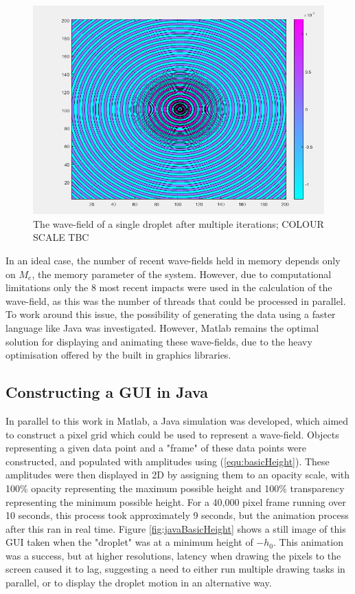 \begin{figure}
\centering
\includegraphics[width=\textwidth]{simulation/matlab.png}
\caption{The wave-field of a single droplet after multiple iterations; COLOUR SCALE TBC}
\label{fig:matlabMaths}
\end{figure}

In an ideal case, the number of recent wave-fields held in memory depends only on $M_e$, the memory parameter of the system. However, due to computational limitations only the 8 most recent impacts were used in the calculation of the wave-field, as this was the number of threads that could be processed in parallel. To work around this issue, the possibility of generating the data using a faster language like Java was investigated. However, Matlab remains the optimal solution for displaying and animating these wave-fields, due to the heavy optimisation offered by the built in graphics libraries.


\subsection{Constructing a GUI in Java}
In parallel to this work in Matlab, a Java simulation was developed, which aimed to construct a pixel grid which could be used to represent a wave-field. Objects representing a given data point and a "frame" of these data points were constructed, and populated with amplitudes using (\ref{equ:basicHeight}). These amplitudes were then displayed in 2D by assigning them to an opacity scale, with 100\% opacity representing the maximum possible height and 100\% transparency representing the minimum possible height. For a 40,000 pixel frame running over 10 seconds, this process took approximately 9 seconds, but the animation process after this ran in real time. Figure \ref{fig:javaBasicHeight} shows a still image of this GUI taken when the "droplet" was at a minimum height of $-h_0$. This animation was a success, but at higher resolutions, latency when drawing the pixels to the screen caused it to lag, suggesting a need to either run multiple drawing tasks in parallel, or to display the droplet motion in an alternative way.

